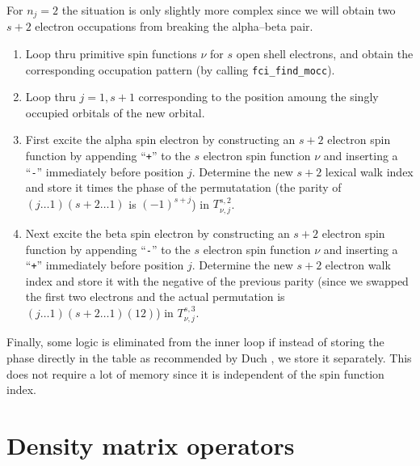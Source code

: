 For $n_j=2$ the situation is only slightly more complex since we will
obtain two $s+2$ electron occupations from breaking the alpha--beta pair.
\begin{enumerate}
\item Loop thru primitive spin functions $\nu$ for $s$ open shell
electrons, and obtain the corresponding occupation pattern (by calling
\verb+fci_find_mocc+).

\item Loop thru $j=1,s+1$ corresponding to the position amoung the
singly occupied orbitals of the new orbital.

\item First excite the alpha spin electron by constructing an $s+2$
electron spin function by appending ``\verb=+='' to the $s$ electron
spin function $\nu$ and inserting a ``\verb=-='' immediately before
position $j$.  Determine the new $s+2$ lexical walk index and store
it times the phase of the permutatation (the parity of $(j \ldots
1)(s+2 \ldots 1)$ is $(-1)^{s+j}$) in $T^{s,2}_{\nu,j}$.

\item Next excite the beta spin electron by constructing an $s+2$
electron spin function by appending ``\verb=-='' to the $s$ electron
spin function $\nu$ and inserting a ``\verb=+='' immediately before
position $j$.  Determine the new $s+2$ electron walk index and store
it with the negative of the previous parity (since we swapped the
first two electrons and the actual permutation is $(j \ldots
1)(s+2 \ldots 1)(1 2)$) in $T^{s,3}_{\nu,j}$.
\end{enumerate}

Finally, some logic is eliminated from the inner loop if instead of
storing the phase directly in the table as recommended by Duch
\cite{duchspinad}, we store it separately.  This does not require a
lot of memory since it is independent of the spin function index.  

\section{Density matrix operators}


